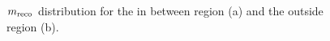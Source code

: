 \begin{figure}[ht]
	\centering
	\hfill
	\caption{$m_{\text{reco}}$ distribution for the in between region (a) and the outside region (b).}
	\label{Fig10}
\end{figure}

